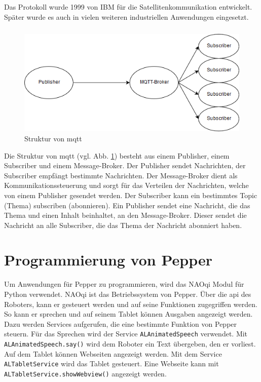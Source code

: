 \subparagraph{}
Das Protokoll wurde 1999 von IBM für die
Satellitenkommunikation entwickelt. Später wurde es auch in vielen weiteren
industriellen Anwendungen eingesetzt.

\subparagraph{}
\begin{figure}
  \centering
     \includegraphics[width=\textwidth]{mqtt-struktur}
  \caption{Struktur von \ac{mqtt}}
  \label{fig:mqtt}
\end{figure}

Die Struktur von \ac{mqtt} (vgl. Abb. \ref{fig:mqtt}) besteht aus einem Publisher,
einem Subscriber und einem Message-Broker. Der Publisher sendet Nachrichten, der Subscriber
empfängt bestimmte Nachrichten. Der Message-Broker dient als
Kommunikationssteuerung und sorgt für das Verteilen der Nachrichten, welche von
einem Publisher gesendet werden. Der Subscriber kann ein bestimmtes Topic
(Thema) subscriben (abonnieren). Ein Publisher sendet eine Nachricht, die das
Thema und einen Inhalt beinhaltet, an den Message-Broker. Dieser sendet die
Nachricht an alle Subscriber, die das Thema der Nachricht abonniert haben.
\cite{dennisseidel2018}

\section{Programmierung von Pepper}\label{sec:programmierung-von-pepper}
Um Anwendungen für Pepper zu programmieren, wird das NAOqi Modul für Python
verwendet. NAOqi ist das Betriebssystem %
von Pepper. Über die \ac{api} des Roboters, kann er gesteuert werden und auf
seine Funktionen zugegriffen werden. So kann er sprechen und auf seinem Tablet
können Ausgaben angezeigt werden. Dazu werden Services aufgerufen, die eine
bestimmte Funktion von Pepper steuern. Für das Sprechen wird der Service
\texttt{ALAnimatedSpeech} verwendet. Mit \texttt{ALAnimatedSpeech.say()} wird
dem Roboter ein Text übergeben, den er vorliest. Auf dem Tablet können Webseiten
angezeigt werden. Mit dem Service \texttt{ALTabletService} wird das Tablet
gesteuert. Eine Webseite kann mit \texttt{ALTabletService.showWebview()}
angezeigt werden.
